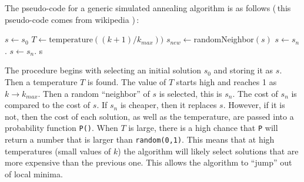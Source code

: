 \documentclass{article}
\newenvironment{Figure}
    {\par\medskip\noindent\minipage{\linewidth}}
    {\endminipage\par\medskip}
\def\code#1{\texttt{#1}}
\begin{document}
\begin{multicols}{2}
        The pseudo-code for a generic simulated annealing algorithm is as follows (\,this pseudo-code comes from wikipedia \cite{wikiAnn})\,:

        \begin{Figure}
            \label{anneal}

                \begin{algorithmic}[1]
                \STATE $\textit{s} \gets s_0$
                \STATE $T \gets \text{temperature}((k+1)/k_{max}))$
                \STATE $s_{new} \gets $randomNeighbor$(s)$
                \STATE $s \gets s_n$.
                \STATE $s \gets s_n$.
                \ENDIF
                \ENDFOR
                \RETURN s
            \end{algorithmic}

        \end{Figure}

        The procedure begins with selecting an initial solution $s_0$ and storing it as $s$. Then a temperature $T$ is found. The value of $T$ starts high and reaches 1 as $k \rightarrow k_{max}$. Then a random ``neighbor'' of $s$ is selected, this is $s_n$. The cost of $s_n$ is compared to the cost of $s$. If $s_n$ is cheaper, then it replaces $s$. However, if it is not, then the cost of each solution, as well as the temperature, are passed into a probability function \code{P()}. When $T$ is large, there is a high chance that \code{P} will return a number that is larger than \code{random(0,1)}. This means that at high temperatures (small values of $k$) the algorithm will likely select solutions that are more expensive than the previous one. This allows the algorithm to ``jump'' out of local minima.


\end{multicols}
\end{document}
